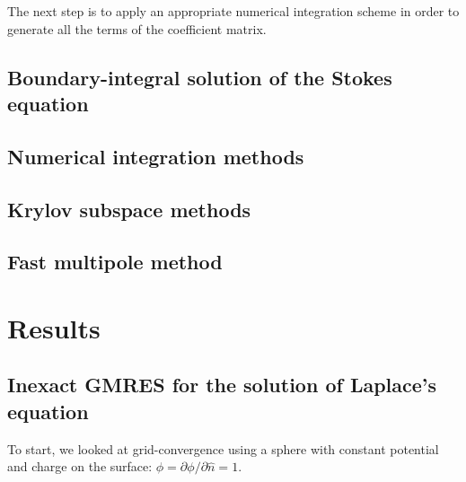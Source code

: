 \documentclass[final,leqno,]{siamltex1213}
\newcommand{\partialdi}[2]{\partial #1 / \partial #2}
\newcommand{\nhat}{\hat{n}}
\begin{document}
The next step is to apply an appropriate numerical integration scheme in order to generate all the terms of the coefficient matrix.

\subsection{Boundary-integral solution of the Stokes equation}

\subsection{Numerical integration methods}

\subsection{Krylov subspace methods}

\subsection{Fast multipole method}

\section{Results}

\subsection{Inexact {\small GMRES} for the solution of Laplace's equation}
To start, we looked at grid-convergence using a sphere with constant potential and charge on the surface: $\phi = \partialdi{\phi}{\nhat} = 1$.
\end{document}
